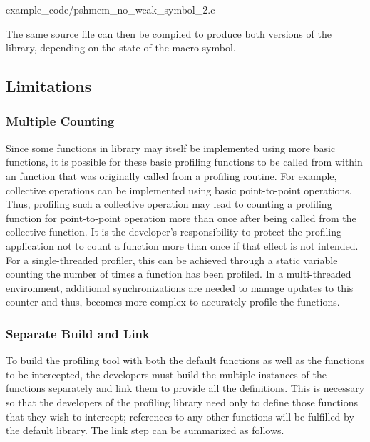 
      {example_code/pshmem_no_weak_symbol_2.c}

The same source file can then be compiled to produce both versions 
of the library, depending on the state of the 
 macro symbol.

\subsection{Limitations}
\label{sec:pshmem_limitations}

\subsubsection{Multiple Counting}
\label{sec:pshmem_multiple_count}
Since some functions in \openshmem library may itself be implemented 
using more basic \openshmem functions, it is possible for these basic  
profiling functions to be called from within an \openshmem function 
that was originally called from a profiling routine. For example, 
\openshmem collective operations can be implemented using basic 
point-to-point operations. Thus, profiling such a collective 
operation may lead to counting a profiling function for 
point-to-point operation more than once after being called from the 
collective function. It is the developer's responsibility to protect 
the profiling application not to count a function more than once if 
that effect is not intended. For a single-threaded profiler, this 
can be achieved through a static variable counting the number of 
times a function has been profiled. In a multi-threaded environment, 
additional synchronizations are needed to manage updates to this 
counter and thus, becomes more complex to accurately profile the 
\openshmem functions.

\subsubsection{Separate Build and Link}
\label{sec:pshmem_separate_build_link}
To build the profiling tool with both the default \openshmem
functions as well as the \openshmem functions to be intercepted, 
the developers must build the multiple instances of the \openshmem
functions separately and link them to provide all the definitions. 
This is necessary so that the developers of the profiling library 
need only to define those \openshmem functions that they wish 
to intercept; references to any other functions will be fulfilled 
by the default \openshmem library. The link step can be summarized 
as follows. \\

